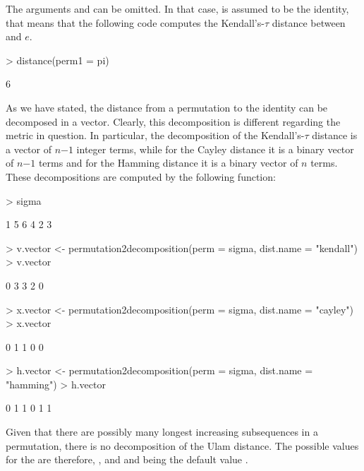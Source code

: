 \documentclass[article,nojss]{jss}
\begin{document}
The arguments  and  can be omitted. In that case,  is assumed to be the identity, that means that the following code computes the Kendall's-$\tau$ distance between  and $e$.
\begin{Schunk}
\begin{Sinput}
> distance(perm1 = pi)
\end{Sinput}
\begin{Soutput}
[1] 6
\end{Soutput}
\end{Schunk}

As we have stated, the distance from a permutation to the identity can be decomposed in a vector. Clearly, this decomposition is different regarding the metric in question. In particular, the decomposition of the Kendall's-$\tau$ distance is a vector of $n$$-1$ integer terms, while for the Cayley distance it is a binary vector of $n$$-1$ terms and for the Hamming distance it is a binary vector of $n$ terms. These decompositions are computed by the following function:
\begin{Schunk}
\begin{Sinput}
> sigma
\end{Sinput}
\begin{Soutput}
[1] 1 5 6 4 2 3
\end{Soutput}
\begin{Sinput}
> v.vector <- permutation2decomposition(perm = sigma, dist.name = "kendall")
> v.vector
\end{Sinput}
\begin{Soutput}
[1] 0 3 3 2 0
\end{Soutput}
\begin{Sinput}
> x.vector <- permutation2decomposition(perm = sigma, dist.name = "cayley")
> x.vector
\end{Sinput}
\begin{Soutput}
[1] 0 1 1 0 0
\end{Soutput}
\begin{Sinput}
> h.vector <- permutation2decomposition(perm = sigma, dist.name = "hamming")
> h.vector
\end{Sinput}
\begin{Soutput}
[1] 0 1 1 0 1 1
\end{Soutput}
\end{Schunk}

Given that there are possibly many longest increasing subsequences in a permutation, there is no decomposition of the Ulam distance. The possible values for the  are therefore, ,  and  and being the default value . 
\end{document}
